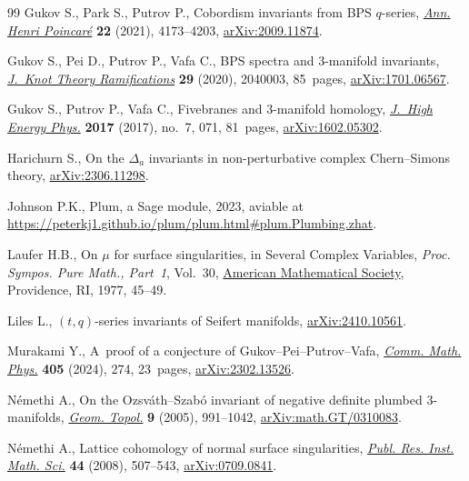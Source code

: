 \documentclass[10pt,a4paper]{amsart}
\begin{document}
\begin{thebibliography}{99}
Gukov S., Park S., Putrov P., Cobordism invariants from {BPS} {$q$}-series,
 \href{https://doi.org/10.1007/s00023-021-01089-2}{\textit{Ann. Henri
 Poincar\'e}} \textbf{22} (2021), 4173--4203,
 \href{http://arxiv.org/abs/2009.11874}{arXiv:2009.11874}.

Gukov S., Pei D., Putrov P., Vafa C., B{PS} spectra and 3-manifold invariants,
 \href{https://doi.org/10.1142/S0218216520400039}{\textit{J.~Knot Theory
 Ramifications}} \textbf{29} (2020), 2040003, 85~pages,
 \href{http://arxiv.org/abs/1701.06567}{arXiv:1701.06567}.

Gukov S., Putrov P., Vafa C., Fivebranes and 3-manifold homology,
 \href{https://doi.org/10.1007/JHEP07(2017)071}{\textit{J.~High Energy Phys.}}
 \textbf{2017} (2017), no.~7, 071, 81~pages,
 \href{http://arxiv.org/abs/1602.05302}{arXiv:1602.05302}.

Harichurn S., On the {$\Delta_a$} invariants in non-perturbative complex
 {C}hern--{S}imons theory,
 \href{http://arxiv.org/abs/2306.11298}{arXiv:2306.11298}.

Johnson P.K., Plum, a {S}age module, 2023, aviable at
 \url{https://peterkj1.github.io/plum/plum.html#plum.Plumbing.zhat}.

Laufer H.B., On {$\mu $} for surface singularities, in Several Complex
 Variables, \textit{Proc. Sympos. Pure Math., Part~1}, Vol.~30,
 \href{https://doi.org/10.1090/pspum/030.1/0450287}{American Mathematical
 Society}, Providence, RI, 1977, 45--49.

Liles L., $(t, q)$-series invariants of {S}eifert manifolds,
 \href{http://arxiv.org/abs/2410.10561}{arXiv:2410.10561}.

Murakami Y., A~proof of a conjecture of {G}ukov--{P}ei--{P}utrov--{V}afa,
 \href{https://doi.org/10.1007/s00220-024-05136-x}{\textit{Comm. Math. Phys.}}
 \textbf{405} (2024), 274, 23~pages,
 \href{http://arxiv.org/abs/2302.13526}{arXiv:2302.13526}.

N\'emethi A., On the {O}zsv\'ath--{S}zab\'o invariant of negative definite
 plumbed 3-manifolds,
 \href{https://doi.org/10.2140/gt.2005.9.991}{\textit{Geom. Topol.}}
 \textbf{9} (2005), 991--1042,
 \href{http://arxiv.org/abs/math.GT/0310083}{arXiv:math.GT/0310083}.

N\'emethi A., Lattice cohomology of normal surface singularities,
 \href{https://doi.org/10.2977/prims/1210167336}{\textit{Publ. Res. Inst.
 Math. Sci.}} \textbf{44} (2008), 507--543,
 \href{http://arxiv.org/abs/0709.0841}{arXiv:0709.0841}.


\end{thebibliography}
\end{document}

